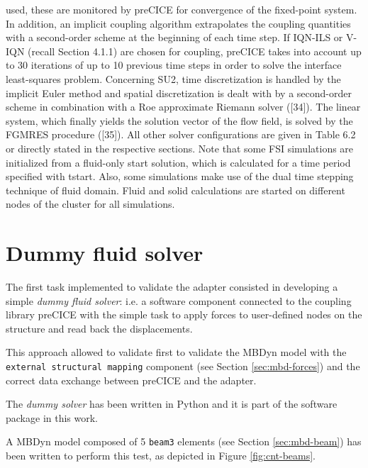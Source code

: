 used, these are monitored by preCICE for convergence of the fixed-point system. In addition, an implicit
coupling algorithm extrapolates the coupling quantities with a second-order scheme at the beginning of
each time step. If IQN-ILS or V-IQN (recall Section 4.1.1) are chosen for coupling, preCICE takes into
account up to 30 iterations of up to 10 previous time steps in order to solve the interface least-squares
problem.
Concerning SU2, time discretization is handled by the implicit Euler method and spatial discretization is
dealt with by a second-order scheme in combination with a Roe approximate Riemann solver ([34]). The
linear system, which finally yields the solution vector of the flow field, is solved by the FGMRES procedure
([35]). All other solver configurations are given in Table 6.2 or directly stated in the respective sections.
Note that some FSI simulations are initialized from a fluid-only start solution, which is calculated for a
time period specified with tstart. Also, some simulations make use of the dual time stepping technique of
fluid domain.
Fluid and solid calculations are started on different nodes of the cluster for all simulations.



\section{Dummy fluid solver}

The first task implemented to validate the adapter consisted in developing a simple \textit{dummy fluid solver}: i.e. a software component connected to the coupling library preCICE with the simple task to apply forces to user-defined nodes on the structure and read back the displacements.

This approach allowed to validate first to validate the MBDyn model with the \texttt{external structural mapping} component (see Section \ref{sec:mbd-forces}) and the correct data exchange between preCICE and the adapter. 

The \textit{dummy solver} has been written in Python and it is part of the software package in this work.

A MBDyn model composed of 5 \texttt{beam3} elements (see Section \ref{sec:mbd-beam}) has been written to perform this test, as depicted in Figure \ref{fig:cnt-beams}. 


